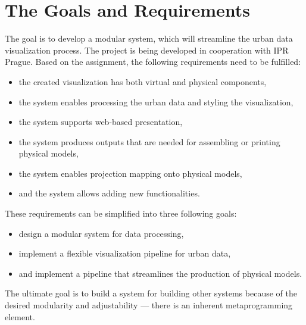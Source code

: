 \section{The Goals and Requirements}
\label{sec:goals}
The goal is to develop a modular system, which will streamline the urban data visualization process. The project is being developed in cooperation with IPR Prague. Based on the assignment, the following requirements need to be fulfilled:
\begin{itemize}[noitemsep]
    \item the created visualization has both virtual and physical components,
    \item the system enables processing the urban data and styling the visualization,
    \item the system supports web-based presentation,
    \item the system produces outputs that are needed for assembling or printing physical models,
    \item the system enables projection mapping onto physical models,
    \item and the system allows adding new functionalities.
\end{itemize}
These requirements can be simplified into three following goals:
\begin{itemize}[noitemsep]
    \item design a modular system for data processing,
    \item implement a flexible visualization pipeline for urban data,
    \item and implement a pipeline that streamlines the production of physical models.
\end{itemize}
The ultimate goal is to build a system for building other systems because of the desired modularity and adjustability --- there is an inherent metaprogramming element.